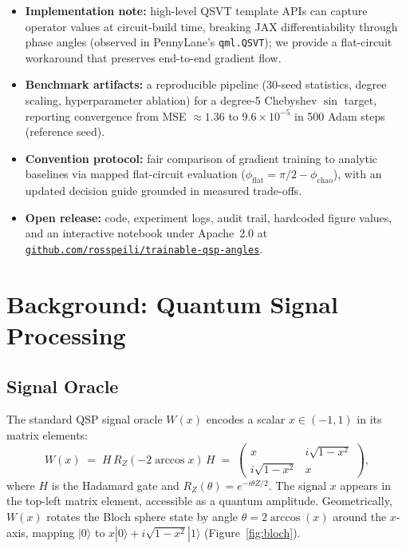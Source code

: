 \documentclass[11pt,a4paper]{article}
\begin{document}
\begin{tcolorbox}[contribbox]
\begin{itemize}\setlength\itemsep{3pt}
  \item[\textbf{C1.}] \textbf{Implementation note:} high-level QSVT template APIs can capture operator values at circuit-build time, breaking JAX differentiability through phase angles (observed in PennyLane's \texttt{qml.QSVT}); we provide a flat-circuit workaround that preserves end-to-end gradient flow.
  \item[\textbf{C2.}] \textbf{Benchmark artifacts:} a reproducible pipeline (30-seed statistics, degree scaling, hyperparameter ablation) for a degree-5 Chebyshev $\sin$ target, reporting convergence from MSE $\approx1.36$ to $9.6\times10^{-5}$ in 500 Adam steps (reference seed).
  \item[\textbf{C3.}] \textbf{Convention protocol:} fair comparison of gradient training to analytic baselines via mapped flat-circuit evaluation ($\phi_{\mathrm{flat}}=\pi/2-\phi_{\mathrm{chao}}$), with an updated decision guide grounded in measured trade-offs.
  \item[\textbf{C4.}] \textbf{Open release:} code, experiment logs, audit trail, hardcoded figure values, and an interactive notebook under Apache~2.0 at \href{https://github.com/rosspeili/trainable-qsp-angles}{\texttt{github.com/rosspeili/trainable-qsp-angles}}.
\end{itemize}
\end{tcolorbox}

\section{Background: Quantum Signal Processing}

\subsection{Signal Oracle}

The standard QSP signal oracle $W(x)$ encodes a scalar $x \in (-1,1)$ in its matrix elements:
\begin{equation}
  W(x) \;=\; H\,R_Z(-2\arccos x)\,H
  \;=\;
  \begin{pmatrix} x & i\sqrt{1-x^2} \\ i\sqrt{1-x^2} & x \end{pmatrix},
\end{equation}
where $H$ is the Hadamard gate and $R_Z(\theta)=e^{-i\theta Z/2}$. The signal $x$ appears in the top-left matrix element, accessible as a quantum amplitude. Geometrically, $W(x)$ rotates the Bloch sphere state by angle $\theta = 2\arccos(x)$ around the $x$-axis, mapping $|0\rangle$ to $x|0\rangle + i\sqrt{1-x^2}|1\rangle$ (Figure~\ref{fig:bloch}).
\end{document}

